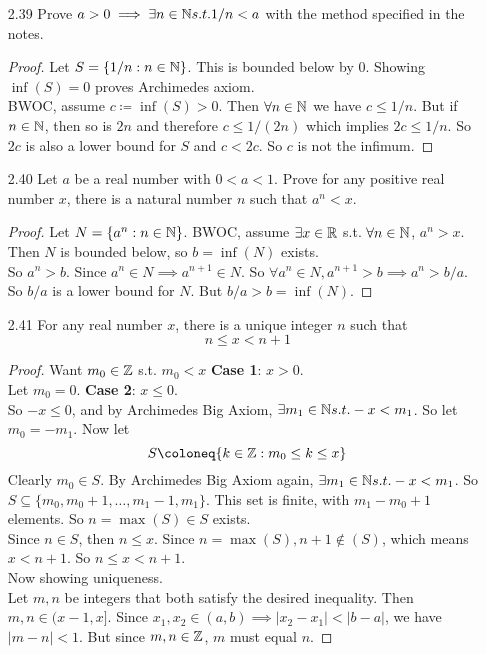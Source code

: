 \documentclass[14pt]{extarticle}
\begin{document}
\begin{enumerate}
\begin{proof}
			So $a^n \leq b$. Since $a^n \in N \implies a^{n+1} \in N$. So $\forall a^n \in N, a^{n+1} \leq b \implies {a^n} \leq b/a$.\\
			So $b/a$ is an upper bound for $N$. But $b/a < b = \sup(N)$. \contra
		\end{proof}
		\item[2.39] Prove $a>0 \implies \exists n\in\mathbb{N} s.t. 1/n < a$ with the method specified in the notes.
		\begin{proof}
			Let $S =\{1/n : n \in \mathbb{N}\}$. This is bounded below by 0. Showing $\inf(S) = 0$ proves Archimedes axiom.\\
			BWOC, assume $c \coloneq \inf(S) > 0$. Then $\forall n \in \mathbb{N}$ we have $c \leq 1/n$. But if $n \in \mathbb{N}$, then so is $2n$ and therefore $c \leq 1/(2n)$ which implies $2c \leq 1/n$. So $2c$ is also a lower bound for $S$ and $c<2c$. So $c$ is not the infimum. \contra
		\end{proof}
		\item[2.40] Let $a$ be a real number with $0<a<1$. Prove for any positive real number $x$, there is a natural number $n$ such that $a^n<x$.
		\begin{proof}
			Let $N = \{a^n : n \in \mathbb{N}\}$. BWOC, assume $\exists x \in \mathbb{R}$ s.t. $\forall n \in \mathbb{N}$, $a^n > x$. Then $N$ is bounded below, so $b=\inf(N)$ exists.\\
			So $a^n > b$. Since $a^n \in N \implies a^{n+1} \in N$. So $\forall a^n \in N, a^{n+1} > b \implies {a^n} > b/a$.\\
			So $b/a$ is a lower bound for $N$. But $b/a > b = \inf(N)$. \contra
		\end{proof}
		\item[2.41] For any real number $x$, there is a unique integer $n$ such that \[n \leq x < n+1\]
		\begin{proof}
			Want $m_0 \in \mathbb{Z}$ s.t. $m_0 < x$ 
			\textbf{Case 1}: $x>0$.\\
			Let $m_0 = 0$.
			\textbf{Case 2}: $x\leq0$.\\
			So $-x \leq 0$, and by Archimedes Big Axiom, $\exists m_1\in\mathbb{N} s.t. -x<m_1$. So let $m_0 = -m_1$.
			Now let \[S \coloneq \{k\in\Z : m_0 \leq k \leq x\}\]
			Clearly $m_0 \in S$. By Archimedes Big Axiom again, $\exists m_1\in\mathbb{N} s.t. -x<m_1$. So $S \subseteq \{m_0,m_0+1,\ldots,m_1-1,m_1\}$. This set is finite, with $m_1-m_0+1$ elements. So $n = \max(S) \in S$ exists.\\
			Since $n \in S$, then $n \leq x$. Since $n = \max(S), n+1 \nin (S)$, which means $x < n+1$. So $n \leq x < n+1$.\\
			Now showing uniqueness.\\
			Let $m,n$ be integers that both satisfy the desired inequality. Then $m,n \in (x-1,x]$. Since $x_1,x_2 \in (a,b) \implies |x_2-x_1| < |b-a|$, we have $|m-n| < 1$. But since $m,n \in \mathbb{Z}$, $m$ must equal $n$.
			

\end{proof}
\end{enumerate}
\end{document}
